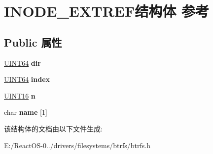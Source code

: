 \hypertarget{struct_i_n_o_d_e___e_x_t_r_e_f}{}\section{I\+N\+O\+D\+E\+\_\+\+E\+X\+T\+R\+E\+F结构体 参考}
\label{struct_i_n_o_d_e___e_x_t_r_e_f}
\subsection*{Public 属性}
\begin{DoxyCompactItemize}
\item 
\mbox{\label{struct_i_n_o_d_e___e_x_t_r_e_f_a4377dcc5e1404aa20cae640a12bd3dbd}} 
\hyperlink{_processor_bind_8h_a57be03562867144161c1bfee95ca8f7c}{U\+I\+N\+T64} {\bfseries dir}
\item 
\mbox{\label{struct_i_n_o_d_e___e_x_t_r_e_f_af859c8002d18c83110ac4e2836f8539f}} 
\hyperlink{_processor_bind_8h_a57be03562867144161c1bfee95ca8f7c}{U\+I\+N\+T64} {\bfseries index}
\item 
\mbox{\label{struct_i_n_o_d_e___e_x_t_r_e_f_a25d20c65913ed349768aa8207dd07baf}} 
\hyperlink{_processor_bind_8h_a09f1a1fb2293e33483cc8d44aefb1eb1}{U\+I\+N\+T16} {\bfseries n}
\item 
\mbox{\label{struct_i_n_o_d_e___e_x_t_r_e_f_ad3d870e29dd7719607ce1e7c1e523aae}} 
char {\bfseries name} \mbox{[}1\mbox{]}
\end{DoxyCompactItemize}


该结构体的文档由以下文件生成\+:\begin{DoxyCompactItemize}
\item 
E\+:/\+React\+O\+S-\/0../drivers/filesystems/btrfs/btrfs.\+h\end{DoxyCompactItemize}
